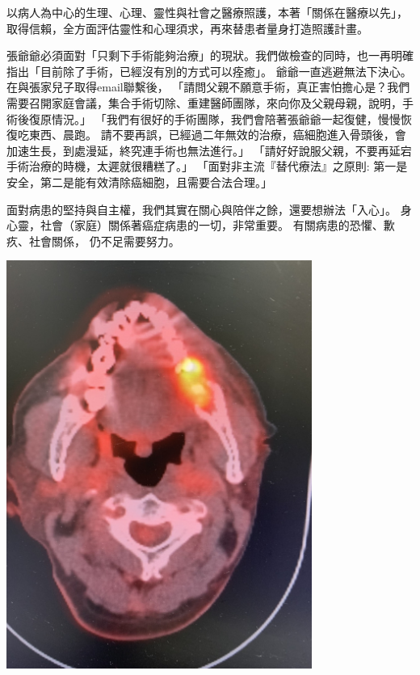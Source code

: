 \documentclass[12pt, a4paper]{article}
\begin{document}
以病人為中心的生理、心理、靈性與社會之醫療照護，本著「關係在醫療以先」，取得信賴，全方面評估靈性和心理須求，再來替患者量身打造照護計畫。



張爺爺必須面對「只剩下手術能夠治療」的現狀。我們做檢查的同時，也一再明確指出「目前除了手術，已經沒有別的方式可以痊癒」。
爺爺一直逃避無法下決心。在與張家兒子取得email聯繫後，
「請問父親不願意手術，真正害怕擔心是？我們需要召開家庭會議，集合手術切除、重建醫師團隊，來向你及父親母親，說明，手術後復原情況。」
「我們有很好的手術團隊，我們會陪著張爺爺一起復健，慢慢恢復吃東西、晨跑。
請不要再誤，已經過二年無效的治療，癌細胞進入骨頭後，會加速生長，到處漫延，終究連手術也無法進行。」
「請好好說服父親，不要再延宕手術治療的時機，太遲就很糟糕了。」
「面對非主流『替代療法』之原則:
第一是安全，第二是能有效清除癌細胞，且需要合法合理。」

面對病患的堅持與自主權，我們其實在關心與陪伴之餘，還要想辦法「入心」。
身心靈，社會（家庭）關係著癌症病患的一切，非常重要。
有關病患的恐懼、歉疚、社會關係，
仍不足需要努力。

\includegraphics[width=10cm]{IMG_5873_PET_CT_scan_20210816.JPG}
\end{document}
